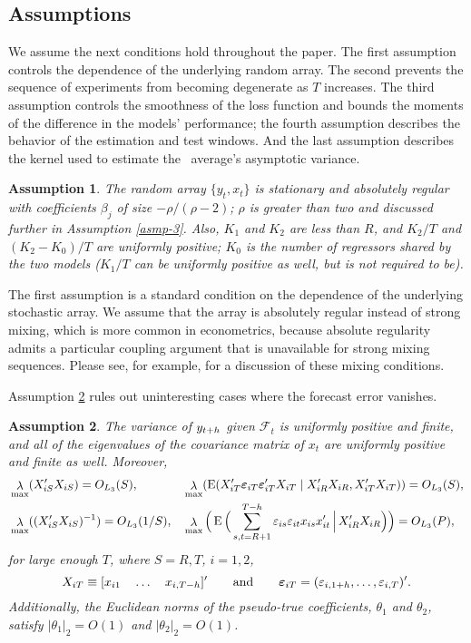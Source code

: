 \documentclass[11pt]{article}
\newcommand{\e}{\varepsilon}
\DeclareMathOperator{\eigen}{\lambda}
\newtheorem{asmp}{Assumption}
\begin{document}
\subsection{Assumptions}

We assume the next conditions hold throughout the paper.  The first
assumption controls the dependence of the underlying random array.
The second prevents the sequence of experiments from becoming
degenerate as $T$ increases.  The third assumption controls the
smoothness of the loss function and bounds the moments of the
difference in the models' performance; the fourth assumption describes
the behavior of the estimation and test windows.  And the last
assumption describes the kernel used to estimate the \oos\ average's
asymptotic variance.

\begin{asmp}\label{asmp-1}
  The random array $\{y_t,x_t\}$ is stationary and absolutely regular
  with coefficients $\beta_j$ of size $-\rho/(\rho-2)$; $\rho$ is
  greater than two and discussed further in Assumption \ref{asmp-3}.
  Also, $K_1$ and $K_2$ are less than $R$, and $K_2/T$ and
  $(K_2-K_0)/T$ are uniformly positive; $K_0$ is the number of
  regressors shared by the two models ($K_1/T$ can be uniformly
  positive as well, but is not required to be).
\end{asmp}

The first assumption is a standard condition on the dependence of the
underlying stochastic array.  We assume that the array is absolutely
regular instead of strong mixing, which is more common in
econometrics, because absolute regularity admits a particular coupling
argument \citep[reproduced in this paper as Lemma A.1]{Ber:79} that is
unavailable for strong mixing sequences.  Please see, for example,
\citet{Dav:94} for a discussion of these mixing conditions.

Assumption \ref{asmp-2} rules out uninteresting cases where the
forecast error vanishes.
\begin{asmp}\label{asmp-2}
  The variance of $y_{t+h}$ given $\mathcal{F}_t$ is uniformly
  positive and finite, and all of the eigenvalues of the covariance
  matrix of $x_t$ are uniformly positive and finite as well.
  Moreover,
  \begin{align*}
    &\eigen_{\max}(X_{iS}'X_{iS}) = O_{L_3}(S),&
    &\eigen_{\max}(\E(X_{iT}'\ep{iT}\ep{iT}'X_{iT}
    \mid X_{iR}'X_{iR}, X_{iT}'X_{iT})) = O_{L_3}(S),\\
    &\eigen_{\max}((X_{iS}'X_{iS})^{-1}) = O_{L_3}(1/S),&
    &\eigen_{\max}\Big(\E\Big( \sum_{s,t=R+1}^{T-h} \e_{is} \e_{it} x_{is}x_{it}'
    \,\Big|\, X_{iR}'X_{iR} \Big)\Big) = O_{L_3}(P),
  \end{align*}
  for large enough $T$, where $S = R,T$, $i = 1,2$,
  \[ X_{iT} \equiv [x_{i1} \quad \dots \quad x_{i,T-\h}]' \qquad
  \text{and} \qquad \ep{iT} = (\e_{i,1+\h}, \dots, \e_{i,T})'.\]
  Additionally, the Euclidean norms of the pseudo-true coefficients,
  $\theta_1$ and $\theta_2$, satisfy $|\theta_1|_2 = O(1)$ and
  $|\theta_2|_2 = O(1)$.
\end{asmp}
\end{document}
